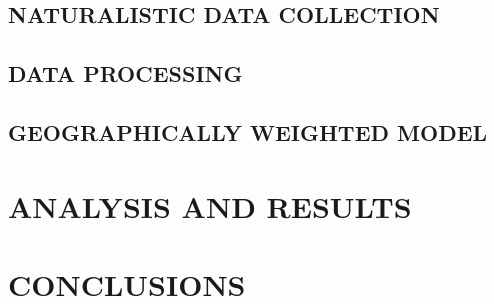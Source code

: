 \section{NATURALISTIC DATA COLLECTION}



\section{DATA PROCESSING} \label{data}






\section{GEOGRAPHICALLY WEIGHTED MODEL} \label{gwm}




\chapter{ANALYSIS AND RESULTS}









\chapter{CONCLUSIONS}
